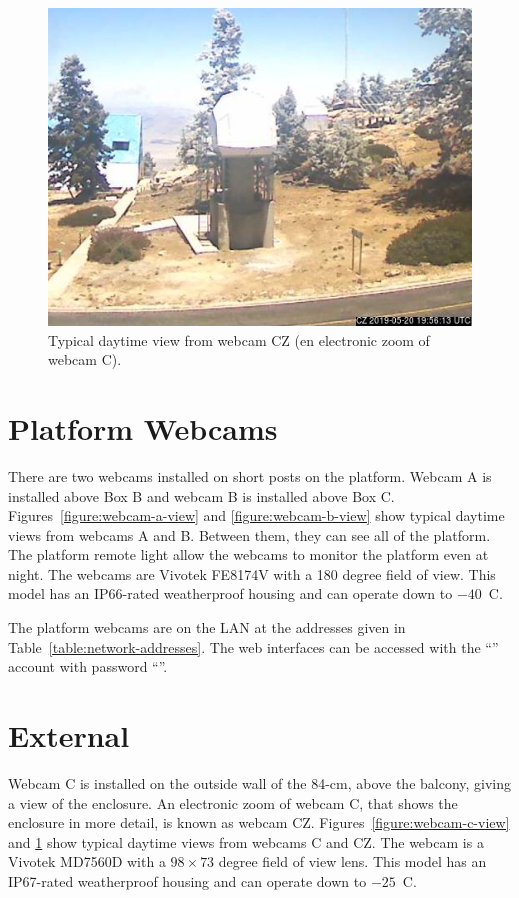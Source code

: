 \begin{figure}[t]
\begin{center}
\fi
\ifddotioan
\includegraphics[height=0.6\linewidth]{figures/ddoti-webcam-cz.jpg}
\fi
\end{center}
\caption{Typical daytime view from {\projectname} webcam CZ (en electronic zoom of webcam C).}
\label{figure:webcam-cz-view}
\end{figure}

\section{Platform Webcams}

There are two webcams installed on short posts on the platform. Webcam A is installed above Box B and webcam B is installed above Box C. Figures~\ref{figure:webcam-a-view} and \ref{figure:webcam-b-view} show typical daytime views from webcams A and B. Between them, they can see all of the platform. The platform remote light allow the webcams to monitor the platform even at night. The webcams are Vivotek FE8174V with a 180 degree field of view. This model has an IP66-rated weatherproof housing and can operate down to $-40$~C.

The platform webcams are on the LAN at the addresses given in Table~\ref{table:network-addresses}. The web interfaces can be accessed with the “\projectaccount” account with password “\projectaccount”.

\section{External}

Webcam C is installed on the outside wall of the 84-cm, above the balcony, giving a view of the {\projectname} enclosure. An electronic zoom of webcam C, that shows the enclosure in more detail, is known as webcam CZ. Figures~\ref{figure:webcam-c-view} and \ref{figure:webcam-cz-view} show typical daytime views from webcams C and CZ.
The webcam is a Vivotek MD7560D with a $98 \times 73$ degree field of view lens. This model has an IP67-rated weatherproof housing and can operate down to $-25$~C.

